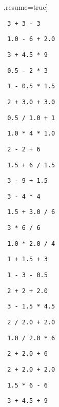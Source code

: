 \begin{exercise}
\begin{sltasks}[counter-format=1.tsk[1],resume=true]
\begin{items}
    \end{items}
    \task
    \begin{items}
      \item \texttt{ 3 + 3 - 3 }
      \item \texttt{ 1.0 - 6 + 2.0 }
      \item \texttt{ 3 + 4.5 * 9 }
      \item \texttt{ 0.5 - 2 * 3 }
      \item \texttt{ 1 - 0.5 * 1.5 }
    \end{items}
    \task
    \begin{items}
      \item \texttt{ 2 + 3.0 + 3.0 }
      \item \texttt{ 0.5 / 1.0 + 1 }
      \item \texttt{ 1.0 * 4 * 1.0 }
      \item \texttt{ 2 - 2 + 6 }
      \item \texttt{ 1.5 + 6 / 1.5 }
    \end{items}
    \task
    \begin{items}
      \item \texttt{ 3 - 9 + 1.5 }
      \item \texttt{ 3 - 4 * 4 }
      \item \texttt{ 1.5 + 3.0 / 6 }
      \item \texttt{ 3 * 6 / 6 }
      \item \texttt{ 1.0 * 2.0 / 4 }
    \end{items}
    \task
    \begin{items}
      \item \texttt{ 1 + 1.5 + 3 }
      \item \texttt{ 1 - 3 - 0.5 }
      \item \texttt{ 2 + 2 + 2.0 }
      \item \texttt{ 3 - 1.5 * 4.5 }
      \item \texttt{ 2 / 2.0 + 2.0 }
    \end{items}
    \task
    \begin{items}
      \item \texttt{ 1.0 / 2.0 * 6 }
      \item \texttt{ 2 + 2.0 + 6 }
      \item \texttt{ 2 + 2.0 + 2.0 }
      \item \texttt{ 1.5 * 6 - 6 }
      \item \texttt{ 3 + 4.5 + 9 }
    \end{items}
\end{sltasks}
\end{exercise}

